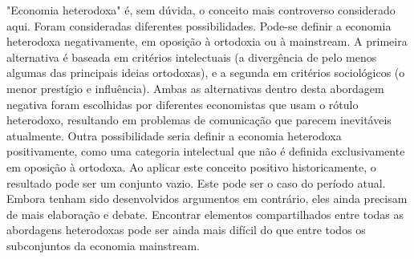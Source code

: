 \documentclass[a4paper,12pt]{article}[abntex2]
\begin{document}
"Economia heterodoxa" é, sem dúvida, o conceito mais controverso considerado aqui. Foram consideradas diferentes possibilidades. Pode-se definir a economia heterodoxa negativamente, em oposição à ortodoxia ou à mainstream. A primeira alternativa é baseada em critérios intelectuais (a divergência de pelo menos algumas das principais ideias ortodoxas), e a segunda em critérios sociológicos (o menor prestígio e influência). Ambas as alternativas dentro desta abordagem negativa foram escolhidas por diferentes economistas que usam o rótulo heterodoxo, resultando em problemas de comunicação que parecem inevitáveis atualmente. Outra possibilidade seria definir a economia heterodoxa positivamente, como uma categoria intelectual que não é definida exclusivamente em oposição à ortodoxa. Ao aplicar este conceito positivo historicamente, o resultado pode ser um conjunto vazio. Este pode ser o caso do período atual. Embora tenham sido desenvolvidos argumentos em contrário, eles ainda precisam de mais elaboração e debate. Encontrar elementos compartilhados entre todas as abordagens heterodoxas pode ser ainda mais difícil do que entre todos os subconjuntos da economia mainstream.
\end{document}
